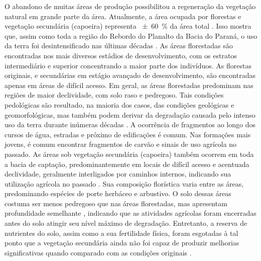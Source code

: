 
O abandono de muitas áreas de produção possibilitou a regeneração da vegetação natural em grande parte da 
área. Atualmente, a área ocupada por florestas e vegetação secundária (capoeira) representa 
\SI{\pm60}{\percent} da área total \cite{SamuelRosaEtAl2011a}. Isso mostra que, assim como toda a região do 
Rebordo do Planalto da Bacia do Paraná, o uso da terra foi desintensificado nas últimas décadas 
\cite{SEMA/UFSM2001, DillEtAl2004, Poelking2007, Miguel2010, SamuelRosaEtAl2011a, Dullius2012, 
tenCatenEtAl2012}. As áreas florestadas são encontradas nos mais diversos estádios de desenvolvimento, com os 
estratos intermediário e superior concentrando a maior parte dos indivíduos. As florestas originais, e 
secundárias em estágio avançado de desenvolvimento, são encontradas apenas em áreas de difícil acesso. Em 
geral, as áreas florestadas predominam nas regiões de maior declividade, com solo raso e pedregoso. Tais 
condições pedológicas são resultado, na maioria dos casos, das condições geológicas e geomorfológicas, mas 
também podem derivar da degradação causada pelo intenso uso da terra durante inúmeras décadas 
\cite{SamuelRosaEtAl2011a}. A ocorrência de fragmentos ao longo dos cursos de água, estradas e próximo de 
edificações é comum. Nas formações mais jovens, é comum encontrar fragmentos de carvão e sinais de uso agrícola 
no passado. As áreas sob vegetação secundária (capoeira) também ocorrem em toda a bacia de captação, 
predominantemente em locais de difícil acesso e acentuada declividade, geralmente interligados por caminhos 
internos, indicando sua utilização agrícola no passado \cite{SamuelRosaEtAl2011a}. Sua composição florística 
varia entre as áreas, predominando espécies de porte herbáceo e arbustivo. O solo dessas áreas costuma ser 
menos pedregoso que nas áreas florestadas, mas apresentam profundidade semelhante \cite{SamuelRosaEtAl2011a}, 
indicando que as atividades agrícolas foram encerradas antes do solo atingir seu nível máximo de degradação. 
Entretanto, a reserva de nutrientes do solo, assim como a sua fertilidade física, foram esgotadas à tal ponto 
que a vegetação secundária ainda não foi 
capaz de produzir melhorias significativas quando comparado com as condições originais \cite{Menezes2008, 
Zalamena2008}.

